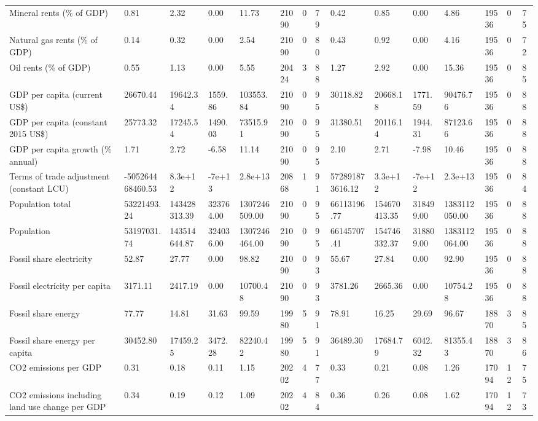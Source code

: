 \begin{longtable}{lllllllllllllll}
\addlinespace
Mineral rents (\% of GDP) & 0.81 & 2.32 & 0.00 & 11.73 & 21090 & 0 & 79 & 0.42 & 0.85 & 0.00 & 4.86 & 19536 & 0 & 75\\
Natural gas rents (\% of GDP) & 0.14 & 0.32 & 0.00 & 2.54 & 21090 & 0 & 80 & 0.43 & 0.92 & 0.00 & 4.16 & 19536 & 0 & 72\\
Oil rents (\% of GDP) & 0.55 & 1.13 & 0.00 & 5.55 & 20424 & 3 & 88 & 1.27 & 2.92 & 0.00 & 15.36 & 19536 & 0 & 85\\
GDP per capita (current US\$) & 26670.44 & 19642.34 & 1559.86 & 103553.84 & 21090 & 0 & 95 & 30118.82 & 20668.18 & 1771.59 & 90476.76 & 19536 & 0 & 88\\
GDP per capita (constant 2015 US\$) & 25773.32 & 17245.54 & 1490.03 & 73515.91 & 21090 & 0 & 95 & 31380.51 & 20116.14 & 1944.31 & 87123.66 & 19536 & 0 & 88\\
\addlinespace
GDP per capita growth (\% annual) & 1.71 & 2.72 & -6.58 & 11.14 & 21090 & 0 & 95 & 2.10 & 2.71 & -7.98 & 10.46 & 19536 & 0 & 88\\
Terms of trade adjustment (constant LCU) & -505264468460.53 & 8.3e+12 & -7e+13 & 2.8e+13 & 20868 & 1 & 91 & 572891873616.12 & 3.3e+12 & -7e+12 & 2.3e+13 & 19536 & 0 & 84\\
Population total & 53221493.24 & 143428313.39 & 323764.00 & 1307246509.00 & 21090 & 0 & 95 & 66113196.77 & 154670413.35 & 318499.00 & 1383112050.00 & 19536 & 0 & 88\\
Population & 53197031.74 & 143514644.87 & 324036.00 & 1307246464.00 & 21090 & 0 & 95 & 66145707.41 & 154746332.37 & 318809.00 & 1383112064.00 & 19536 & 0 & 88\\
Fossil share electricity & 52.87 & 27.77 & 0.00 & 98.82 & 21090 & 0 & 93 & 55.67 & 27.84 & 0.00 & 92.90 & 19536 & 0 & 88\\
\addlinespace
Fossil electricity per capita & 3171.11 & 2417.19 & 0.00 & 10700.48 & 21090 & 0 & 93 & 3781.26 & 2665.36 & 0.00 & 10754.28 & 19536 & 0 & 88\\
Fossil share energy & 77.77 & 14.81 & 31.63 & 99.59 & 19980 & 5 & 91 & 78.91 & 16.25 & 29.69 & 96.67 & 18870 & 3 & 85\\
Fossil share energy per capita & 30452.80 & 17459.25 & 3472.28 & 82240.42 & 19980 & 5 & 91 & 36489.30 & 17684.79 & 6042.32 & 81355.43 & 18870 & 3 & 86\\
CO2 emissions per GDP & 0.31 & 0.18 & 0.11 & 1.15 & 20202 & 4 & 77 & 0.33 & 0.21 & 0.08 & 1.26 & 17094 & 12 & 75\\
CO2 emissions including land use change per GDP & 0.34 & 0.19 & 0.12 & 1.09 & 20202 & 4 & 84 & 0.36 & 0.26 & 0.08 & 1.62 & 17094 & 12 & 73\\

\end{longtable}
